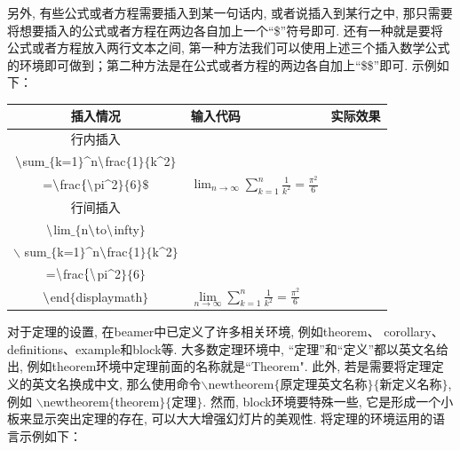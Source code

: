 另外, 有些公式或者方程需要插入到某一句话内, 或者说插入到某行之中, 那只需要将想要插入的公式或者方程在两边各自加上一个“\$”符号即可. 还有一种就是要将公式或者方程放入两行文本之间, 第一种方法我们可以使用上述三个插入数学公式的环境即可做到；第二种方法是在公式或者方程的两边各自加上“\$\$”即可. 示例如下：
\def\parlen{180pt}
\begin{center}
    \begin{tabular}{c|l|c}
    插入情况& 输入代码 & 实际效果 \\\hline
    行内插入
        &\makecell[l]{%
          \$ $\bs$lim$\_\{$n$\bs$to$\bs$infty$\}$\\[-5pt]
          $\bs$sum$\_\{$k=1$\}$\^{}n$\bs$frac$\{$1$\}\{$k\^{}2$\}$\\[-5pt]
          =$\bs$frac$\{\backslash$pi\^{}2$\}\{$6$\}\$$}
        &$\lim_{n\to\infty}\sum_{k=1}^n\frac{1}{k^2}
                =\frac{\pi^2}{6}$\\ \hline
    行间插入&
        \makecell[l]{
           $\bs$begin$\{$displaymath$\}$\\[-5pt]
           $\bs$lim$\_\{$n$\bs$to$\bs$infty$\}$\\ [-5pt] \hspace{-10pt}$\backslash$ sum$\_\{$k=1$\}$\^{}n$\bs$frac$\{$1$\}\{$k\^{}2$\}$\\[-5pt]
            =$\bs$frac$\{\backslash$pi\^{}2$\}\{$6$\}$\\[-5pt]
            $\bs$end$\{$displaymath$\}$}
            &$\lim\limits_{n\to\infty}
            \displaystyle\sum_{k=1}^n\frac{1}{k^2}
            =\frac{\pi^2}{6}$\\ \hline
    \end{tabular}
\end{center}


对于定理的设置, 在beamer中已定义了许多相关环境, 例如theorem、 corollary、definitions、example和block等. 大多数定理环境中, “定理”和“定义”都以英文名给出, 例如theorem环境中定理前面的名称就是``Theorem". 此外, 若是需要将定理定义的英文名换成中文, 那么使用命令$\backslash$newtheorem$\{$原定理英文名称$\}\{$新定义名称$\}$, 例如
$\backslash$newtheorem$\{$theorem$\}\{$定理$\}$. 然而, block环境要特殊一些, 它是形成一个小板来显示突出定理的存在, 可以大大增强幻灯片的美观性. 将定理的环境运用的语言示例如下：


